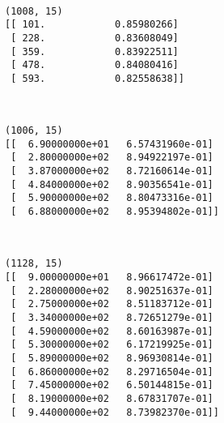 \documentclass{article}
\begin{document}
    \begin{center}
    \end{center}
    { \hspace*{\fill} \\}
    
    \begin{Verbatim}[commandchars=\\\{\}]
(1008, 15)
[[ 101.            0.85980266]
 [ 228.            0.83608049]
 [ 359.            0.83922511]
 [ 478.            0.84080416]
 [ 593.            0.82558638]]
    \end{Verbatim}

    \begin{center}
    \end{center}
    { \hspace*{\fill} \\}
    
    \begin{Verbatim}[commandchars=\\\{\}]
(1006, 15)
[[  6.90000000e+01   6.57431960e-01]
 [  2.80000000e+02   8.94922197e-01]
 [  3.87000000e+02   8.72160614e-01]
 [  4.84000000e+02   8.90356541e-01]
 [  5.90000000e+02   8.80473316e-01]
 [  6.88000000e+02   8.95394802e-01]]
    \end{Verbatim}

    \begin{center}
    \end{center}
    { \hspace*{\fill} \\}
    
    \begin{Verbatim}[commandchars=\\\{\}]
(1128, 15)
[[  9.00000000e+01   8.96617472e-01]
 [  2.28000000e+02   8.90251637e-01]
 [  2.75000000e+02   8.51183712e-01]
 [  3.34000000e+02   8.72651279e-01]
 [  4.59000000e+02   8.60163987e-01]
 [  5.30000000e+02   6.17219925e-01]
 [  5.89000000e+02   8.96930814e-01]
 [  6.86000000e+02   8.29716504e-01]
 [  7.45000000e+02   6.50144815e-01]
 [  8.19000000e+02   8.67831707e-01]
 [  9.44000000e+02   8.73982370e-01]]
    \end{Verbatim}
\end{document}
